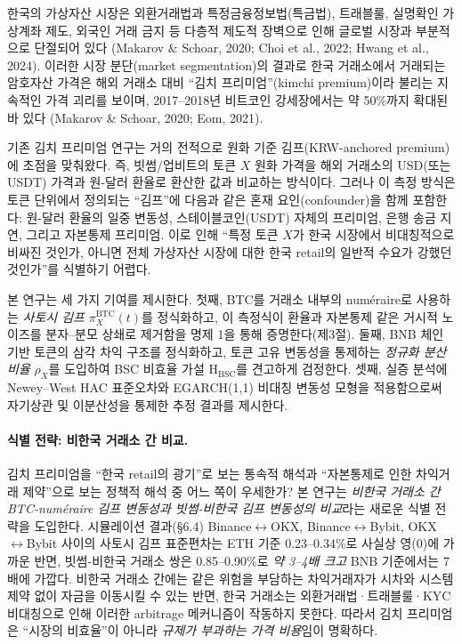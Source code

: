 \documentclass[11pt,a4paper]{article}
\begin{document}
한국의 가상자산 시장은 외환거래법과 특정금융정보법(특금법), 트래블룰, 실명확인 가상계좌 제도,
외국인 거래 금지 등 다층적 제도적 장벽으로 인해 글로벌 시장과 부분적으로 단절되어 있다
(Makarov \& Schoar, 2020; Choi et al., 2022; Hwang et al., 2024). 이러한 시장 분단(market segmentation)의
결과로 한국 거래소에서 거래되는 암호자산 가격은 해외 거래소 대비 ``김치 프리미엄''(kimchi premium)이라
불리는 지속적인 가격 괴리를 보이며, 2017--2018년 비트코인 강세장에서는 약 50\%까지 확대된 바 있다
(Makarov \& Schoar, 2020; Eom, 2021).

기존 김치 프리미엄 연구는 거의 전적으로 원화 기준 김프(KRW-anchored premium)에 초점을 맞춰왔다.
즉, 빗썸/업비트의 토큰 $X$ 원화 가격을 해외 거래소의 USD(또는 USDT) 가격과 원-달러 환율로
환산한 값과 비교하는 방식이다. 그러나 이 측정 방식은 토큰 단위에서 정의되는 ``김프''에 다음과 같은
혼재 요인(confounder)을 함께 포함한다: 원-달러 환율의 일중 변동성, 스테이블코인(USDT) 자체의 프리미엄,
은행 송금 지연, 그리고 자본통제 프리미엄. 이로 인해 ``특정 토큰 $X$가 한국 시장에서 비대칭적으로
비싸진 것인가, 아니면 전체 가상자산 시장에 대한 한국 retail의 일반적 수요가 강했던 것인가''를
식별하기 어렵다.

본 연구는 세 가지 기여를 제시한다. 첫째, BTC를 거래소 내부의 num\'eraire로 사용하는
\emph{사토시 김프} $\pi^{\text{BTC}}_X(t)$를 정식화하고, 이 측정식이 환율과 자본통제 같은
거시적 노이즈를 분자--분모 상쇄로 제거함을 명제 1을 통해 증명한다(제3절). 둘째, BNB 체인 기반 토큰의
삼각 차익 구조를 정식화하고, 토큰 고유 변동성을 통제하는 \emph{정규화 분산 비율} $\rho_X$를 도입하여
BSC 비효율 가설 H$_{\text{BSC}}$를 견고하게 검정한다. 셋째, 실증 분석에 Newey--West HAC 표준오차와
EGARCH(1,1) 비대칭 변동성 모형을 적용함으로써 자기상관 및 이분산성을 통제한 추정 결과를 제시한다.

\paragraph{식별 전략: 비한국 거래소 간 비교.}
김치 프리미엄을 ``한국 retail의 광기''로 보는 통속적 해석과 ``자본통제로 인한 차익거래 제약''으로 보는
정책적 해석 중 어느 쪽이 우세한가? 본 연구는 \emph{비한국 거래소 간 BTC-num\'eraire 김프 변동성과
빗썸-비한국 김프 변동성의 비교}라는 새로운 식별 전략을 도입한다. 시뮬레이션 결과(§6.4) Binance$\leftrightarrow$OKX,
Binance$\leftrightarrow$Bybit, OKX$\leftrightarrow$Bybit 사이의 사토시 김프 표준편차는 ETH 기준 0.23--0.34\%로 사실상 영(0)에
가까운 반면, 빗썸-비한국 거래소 쌍은 0.85--0.90\%로 \emph{약 3--4배 크고} BNB 기준에서는 7배에
가깝다. 비한국 거래소 간에는 같은 위험을 부담하는 차익거래자가 시차와 시스템 제약 없이
자금을 이동시킬 수 있는 반면, 한국 거래소는 외환거래법·트래블룰·KYC 비대칭으로 인해 이러한
arbitrage 메커니즘이 작동하지 못한다. 따라서 김치 프리미엄은 ``시장의 비효율''이 아니라
\emph{규제가 부과하는 가격 비용}임이 명확하다.
\end{document}
